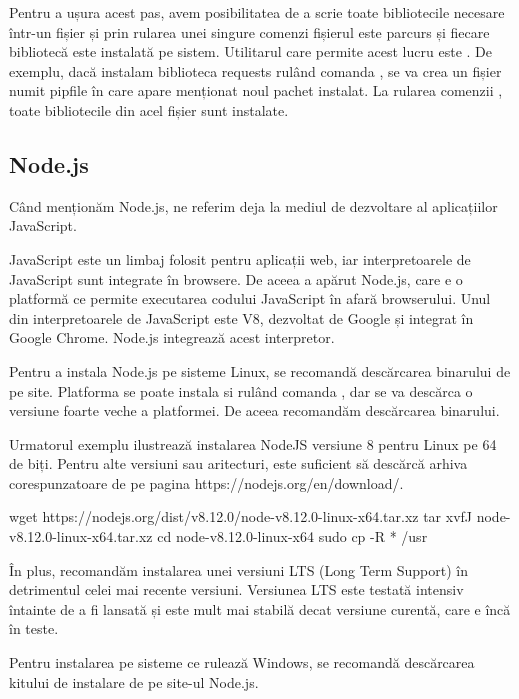 Pentru a ușura acest pas, avem posibilitatea de a scrie toate bibliotecile
necesare într-un fișier și prin rularea unei singure comenzi fișierul este
parcurs și fiecare bibliotecă este instalată pe sistem. Utilitarul care permite
acest lucru este . De exemplu, dacă instalam biblioteca requests
rulând comanda , se va crea un fișier numit pipfile
în care apare menționat noul pachet instalat. La rularea comenzii , toate bibliotecile din acel fișier sunt instalate.

\subsection{Node.js}
\label{sec:appdev-ideinstall-js}

Când menționăm Node.js, ne referim deja la mediul de dezvoltare al aplicațiilor
JavaScript.

JavaScript este un limbaj folosit pentru aplicații web, iar interpretoarele de
JavaScript sunt integrate în browsere. De aceea a apărut Node.js, care e o
platformă ce permite executarea codului JavaScript în afară browserului. Unul
din interpretoarele de JavaScript este V8, dezvoltat de Google și integrat în
Google Chrome. Node.js integrează acest interpretor.

Pentru a instala Node.js pe sisteme Linux, se recomandă descărcarea binarului de
pe site. Platforma se poate instala si rulând comanda , dar se va descărca o versiune foarte veche a platformei. De aceea
recomandăm descărcarea binarului.

Urmatorul exemplu ilustrează instalarea NodeJS versiune 8 pentru Linux pe 64 de
biți. Pentru alte versiuni sau aritecturi, este suficient să descărcă arhiva
corespunzatoare de pe pagina https://nodejs.org/en/download/.

\begin{screen}
wget https://nodejs.org/dist/v8.12.0/node-v8.12.0-linux-x64.tar.xz
tar xvfJ node-v8.12.0-linux-x64.tar.xz
cd node-v8.12.0-linux-x64
sudo cp -R * /usr
\end{screen}

În plus, recomandăm instalarea unei versiuni LTS 
(Long Term Support) în detrimentul celei mai recente versiuni. Versiunea LTS
este testată intensiv întainte de a fi lansată și este mult mai stabilă decat
versiune curentă, care e încă în teste.

Pentru instalarea pe sisteme ce rulează Windows, se recomandă descărcarea
kitului de instalare de pe site-ul Node.js.

